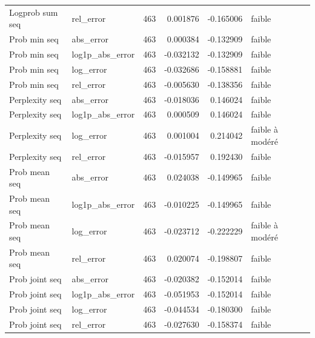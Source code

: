 \begin{longtable}{p{4.0cm}p{2.5cm}rrrll}
Logprob sum seq & rel\_error & 463 & 0.001876 & -0.165006 & faible \\
Prob min seq & abs\_error & 463 & 0.000384 & -0.132909 & faible \\
Prob min seq & log1p\_abs\_error & 463 & -0.032132 & -0.132909 & faible \\
Prob min seq & log\_error & 463 & -0.032686 & -0.158881 & faible \\
Prob min seq & rel\_error & 463 & -0.005630 & -0.138356 & faible \\
Perplexity seq & abs\_error & 463 & -0.018036 & 0.146024 & faible \\
Perplexity seq & log1p\_abs\_error & 463 & 0.000509 & 0.146024 & faible \\
Perplexity seq & log\_error & 463 & 0.001004 & 0.214042 & faible à modéré \\
Perplexity seq & rel\_error & 463 & -0.015957 & 0.192430 & faible \\
Prob mean seq & abs\_error & 463 & 0.024038 & -0.149965 & faible \\
Prob mean seq & log1p\_abs\_error & 463 & -0.010225 & -0.149965 & faible \\
Prob mean seq & log\_error & 463 & -0.023712 & -0.222229 & faible à modéré \\
Prob mean seq & rel\_error & 463 & 0.020074 & -0.198807 & faible \\
Prob joint seq & abs\_error & 463 & -0.020382 & -0.152014 & faible \\
Prob joint seq & log1p\_abs\_error & 463 & -0.051953 & -0.152014 & faible \\
Prob joint seq & log\_error & 463 & -0.044534 & -0.180300 & faible \\
Prob joint seq & rel\_error & 463 & -0.027630 & -0.158374 & faible \\
\end{longtable}
